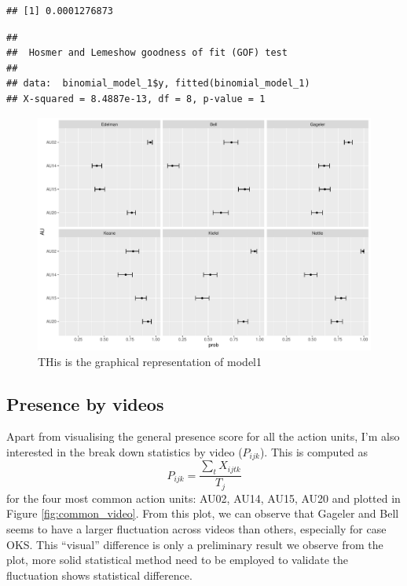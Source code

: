 \documentclass{monashthesis}
\begin{document}
\begin{verbatim}
## [1] 0.0001276873
\end{verbatim}

\begin{verbatim}
## 
##  Hosmer and Lemeshow goodness of fit (GOF) test
## 
## data:  binomial_model_1$y, fitted(binomial_model_1)
## X-squared = 8.4887e-13, df = 8, p-value = 1
\end{verbatim}

\begin{figure}

{\centering \includegraphics[width=1\linewidth]{figures/unnamed-chunk-9-1} 

}

\caption{THis is the graphical representation of model1\label{fig:model_1_plot}}\label{fig:unnamed-chunk-9}
\end{figure}

\hypertarget{presence-by-videos}{%
\subsection{Presence by videos}\label{presence-by-videos}}

Apart from visualising the general presence score for all the action units, I'm also interested in the break down statistics by video (\(P_{ijk}\)). This is computed as \[P_{ijk} = \frac{\sum_{t}X_{ijtk}}{T_j}\] for the four most common action units: AU02, AU14, AU15, AU20 and plotted in Figure \ref{fig:common_video}. From this plot, we can observe that Gageler and Bell seems to have a larger fluctuation across videos than others, especially for case OKS. This ``visual'' difference is only a preliminary result we observe from the plot, more solid statistical method need to be employed to validate the fluctuation shows statistical difference.
\end{document}
